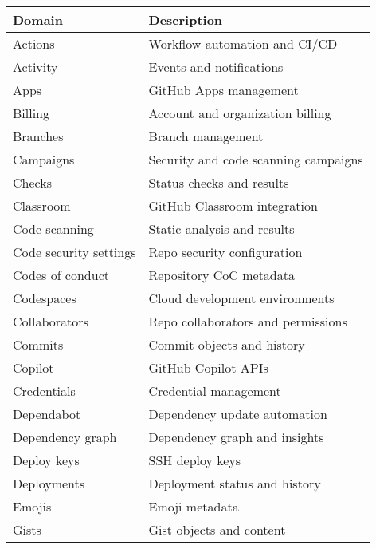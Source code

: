 \documentclass[openany, 12pt]{book}
\begin{document}
\begin{table}[h]
	\centering
	\begin{tabular}{ll}
		\toprule
		\textbf{Domain}        & \textbf{Description}                 \\
		\midrule
		Actions                & Workflow automation and CI/CD        \\
		Activity               & Events and notifications             \\
		Apps                   & GitHub Apps management               \\
		Billing                & Account and organization billing     \\
		Branches               & Branch management                    \\
		Campaigns              & Security and code scanning campaigns \\
		Checks                 & Status checks and results            \\
		Classroom              & GitHub Classroom integration         \\
		Code scanning          & Static analysis and results          \\
		Code security settings & Repo security configuration          \\
		Codes of conduct       & Repository CoC metadata              \\
		Codespaces             & Cloud development environments       \\
		Collaborators          & Repo collaborators and permissions   \\
		Commits                & Commit objects and history           \\
		Copilot                & GitHub Copilot APIs                  \\
		Credentials            & Credential management                \\
		Dependabot             & Dependency update automation         \\
		Dependency graph       & Dependency graph and insights        \\
		Deploy keys            & SSH deploy keys                      \\
		Deployments            & Deployment status and history        \\
		Emojis                 & Emoji metadata                       \\
		Gists                  & Gist objects and content             \\

\end{tabular}
\end{table}
\end{document}

